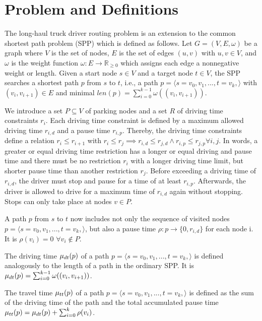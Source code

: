 \chapter{Problem and Definitions}\label{chapter:problem_definitions}
The long-haul truck driver routing problem is an extension to the common shortest path problem (SPP) which is defined as follows. Let $G=(V,E,\omega)$ be a graph where $V$ is the set of nodes, $E$ is the set of edges $(u,v)$ with $u,v \in V$, and $\omega$ is the weight function $\omega: E \rightarrow \mathbb{R}_{\ge 0}$ which assigns each edge a nonnegative weight or length. Given a start node $s \in V$ and a target node $t \in V$, the SPP searches a shortest path $p$ from $s$ to $t$, i.e., a path $p = \langle s=v_0,v_1,...,t=v_k, \rangle$ with $(v_i,v_{i+1}) \in E$ and minimal $len(p) = \sum_{i=0}^{k-1} \omega((v_{i}, v_{i+1}))$.

We introduce a set $P \subseteq V$ of parking nodes and a set $R$ of driving time constraints $r_i$. Each driving time constraint is defined by a maximum allowed driving time $r_{i,d}$ and a pause time $r_{i,p}$. Thereby, the driving time constraints define a relation $r_i \le r_{i+1}$ with $r_i \le r_j \implies r_{i,d} \le r_{j,d} \land  r_{i,p} \le r_{j,p} \forall i,j$. In words, a greater or equal driving time restriction has a longer or equal driving and pause time and there must be no restriction $r_i$ with a longer driving time limit, but shorter pause time than another restriction $r_j$. Before exceeding a driving time of $r_{i,d}$, the driver must stop and pause for a time of at least $r_{i,p}$. Afterwards, the driver is allowed to drive for a maximum time of $r_{i,d}$ again without stopping. Stops can only take place at nodes $v \in P$.

A path $p$ from $s$ to $t$ now includes not only the sequence of visited nodes $p = \langle s=v_0,v_1,...,t=v_k, \rangle$, but also a pause time $\rho: p \rightarrow \{0,r_{i,d}\}$ for each node i. It is $\rho(v_i) = 0$ $\forall v_i \notin P$.

\begin{definition}
	The driving time $\mu_{dt}(p)$ of a path  $p = \langle s=v_0,v_1,...,t=v_k, \rangle$ is defined analogously to the length of a path in the ordinary SPP. It is $\mu_{dt}(p) = \sum_{i=0}^{k-1} \omega((v_{i}, v_{i+1}))$.
\end{definition}

\begin{definition}
	The travel time $\mu_{tt}(p)$ of a path  $p = \langle s=v_0,v_1,...,t=v_k, \rangle$ is defined as the sum of the driving time of the path and the total accumulated pause time $\mu_{tt}(p) = \mu_{dt}(p) + \sum_{i=0}^{k} \rho(v_i)$.
\end{definition}

